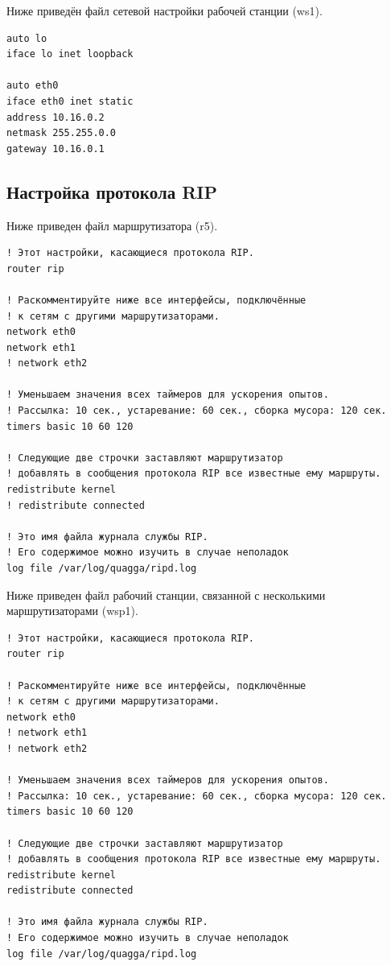 \documentclass[a4paper,12pt]{article}
\begin{document}
Ниже приведён файл сетевой настройки рабочей станции (ws1).

\begin{Verbatim}
auto lo
iface lo inet loopback

auto eth0
iface eth0 inet static
address 10.16.0.2
netmask 255.255.0.0
gateway 10.16.0.1
\end{Verbatim}



\subsection{Настройка протокола RIP}

Ниже приведен файл  маршрутизатора (r5).

\begin{Verbatim}
! Этот настройки, касающиеся протокола RIP.
router rip

! Раскомментируйте ниже все интерфейсы, подключённые
! к сетям с другими маршрутизаторами.
network eth0
network eth1
! network eth2

! Уменьшаем значения всех таймеров для ускорения опытов.
! Рассылка: 10 сек., устаревание: 60 cек., сборка мусора: 120 сек.
timers basic 10 60 120

! Следующие две строчки заставляют маршрутизатор
! добавлять в сообщения протокола RIP все известные ему маршруты.
redistribute kernel
! redistribute connected

! Это имя файла журнала службы RIP.
! Его содержимое можно изучить в случае неполадок
log file /var/log/quagga/ripd.log
\end{Verbatim}


Ниже приведен файл  рабочий станции, связанной с несколькими маршрутизаторами (wsp1).

\begin{Verbatim}
! Этот настройки, касающиеся протокола RIP.
router rip

! Раскомментируйте ниже все интерфейсы, подключённые
! к сетям с другими маршрутизаторами.
network eth0
! network eth1
! network eth2

! Уменьшаем значения всех таймеров для ускорения опытов.
! Рассылка: 10 сек., устаревание: 60 cек., сборка мусора: 120 сек.
timers basic 10 60 120

! Следующие две строчки заставляют маршрутизатор
! добавлять в сообщения протокола RIP все известные ему маршруты.
redistribute kernel
redistribute connected

! Это имя файла журнала службы RIP.
! Его содержимое можно изучить в случае неполадок
log file /var/log/quagga/ripd.log
\end{Verbatim}
\end{document}
